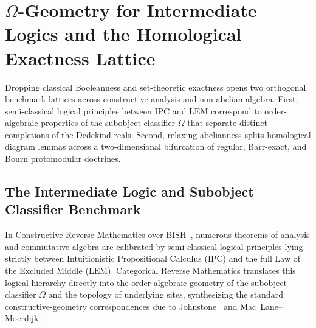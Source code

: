 \section{$\Omega$-Geometry for Intermediate Logics and the Homological Exactness Lattice}\label{sec:panorama-omega-homological}

Dropping classical Booleanness and set-theoretic exactness opens two orthogonal benchmark lattices across constructive analysis and non-abelian algebra. First, semi-classical logical principles between $\mathrm{IPC}$ and $\mathrm{LEM}$ correspond to order-algebraic properties of the subobject classifier $\Omega$ that separate distinct completions of the Dedekind reals. Second, relaxing abelianness splits homological diagram lemmas across a two-dimensional bifurcation of regular, Barr-exact, and Bourn protomodular doctrines.

\subsection{The Intermediate Logic and Subobject Classifier Benchmark}

In Constructive Reverse Mathematics over $\mathrm{BISH}$~\cite{Bishop67,Ishihara06}, numerous theorems of analysis and commutative algebra are calibrated by semi-classical logical principles lying strictly between Intuitionistic Propositional Calculus ($\mathrm{IPC}$) and the full Law of the Excluded Middle ($\mathrm{LEM}$). Categorical Reverse Mathematics translates this logical hierarchy directly into the order-algebraic geometry of the subobject classifier $\Omega$ and the topology of underlying sites, synthesizing the standard constructive-geometry correspondences due to Johnstone~\cite{Johnstone82,Johnstone02} and Mac~Lane--Moerdijk~\cite{MacLaneMoerdijk92}:

